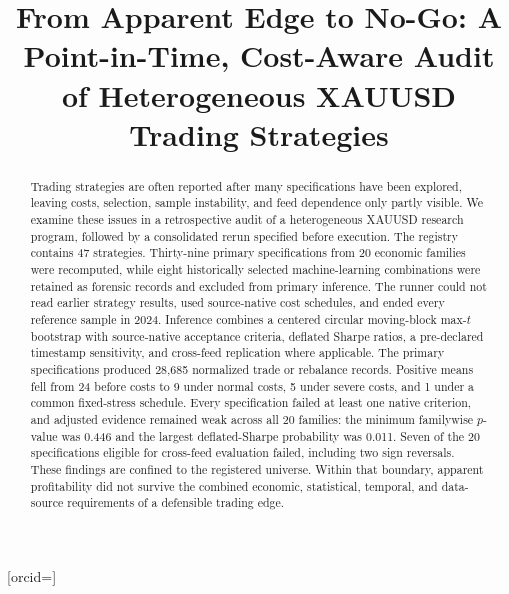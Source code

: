 \documentclass[a4paper,fleqn]{cas-sc}
\begin{document}
\let\WriteBookmarks\relax
\def\floatpagepagefraction{.8}
\def\textpagefraction{.1}

\shortauthors{\AuthorShortName}

\title[mode=title]{From Apparent Edge to No-Go: A Point-in-Time, Cost-Aware Audit of Heterogeneous XAUUSD Trading Strategies}

\author[1]{\AuthorName}[orcid=\AuthorORCID]
\cormark[1]



\begin{abstract}
Trading strategies are often reported after many specifications have been explored, leaving costs, selection, sample instability, and feed dependence only partly visible. We examine these issues in a retrospective audit of a heterogeneous XAUUSD research program, followed by a consolidated rerun specified before execution. The registry contains 47 strategies. Thirty-nine primary specifications from 20 economic families were recomputed, while eight historically selected machine-learning combinations were retained as forensic records and excluded from primary inference. The runner could not read earlier strategy results, used source-native cost schedules, and ended every reference sample in 2024. Inference combines a centered circular moving-block max-$t$ bootstrap with source-native acceptance criteria, deflated Sharpe ratios, a pre-declared timestamp sensitivity, and cross-feed replication where applicable. The primary specifications produced 28,685 normalized trade or rebalance records. Positive means fell from 24 before costs to 9 under normal costs, 5 under severe costs, and 1 under a common fixed-stress schedule. Every specification failed at least one native criterion, and adjusted evidence remained weak across all 20 families: the minimum familywise $p$-value was 0.446 and the largest deflated-Sharpe probability was 0.011. Seven of the 20 specifications eligible for cross-feed evaluation failed, including two sign reversals. These findings are confined to the registered universe. Within that boundary, apparent profitability did not survive the combined economic, statistical, temporal, and data-source requirements of a defensible trading edge.
\end{abstract}
\end{document}
